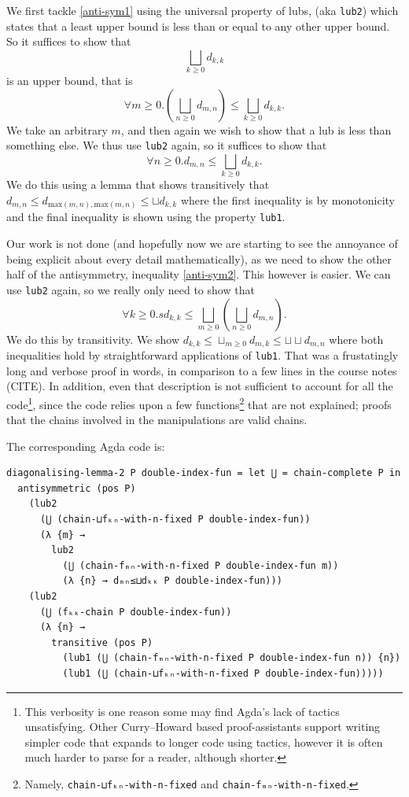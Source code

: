 \documentclass[12pt,a4paper,twoside,openright]{report}
\begin{document}
We first tackle \ref{anti-sym1} using the universal property of lubs, (aka \texttt{lub2}) which states that a least upper bound is less than or equal to any other upper bound. So it suffices to show that 
\[
\bigsqcup_{k \geq 0} d_{k, k} 
\]
is an upper bound, that is
\[
\forall m \geq 0. \left( \bigsqcup_{n\geq 0} d_{m,n} \right) \leq \bigsqcup_{k \geq 0} d_{k, k}.
\]
We take an arbitrary $m$, and then again we wish to show that a lub is less than something else. We thus use \texttt{lub2} again, so it suffices to show that
\[
\forall n \geq 0. d_{m, n} \leq \bigsqcup_{k \geq 0} d_{k , k}.
\]
We do this using a lemma that shows transitively that $d_{m,n} \leq d_{\text{max}(m,n), \text{max}(m,n)} \leq \sqcup d_{k,k}$ where the first inequality is by monotonicity and the final inequality is shown using the property \texttt{lub1}. 

Our work is not done (and hopefully now we are starting to see the annoyance of being explicit about every detail mathematically), as we need to show the other half of the antisymmetry, inequality \ref{anti-sym2}. This however is easier. We can use \texttt{lub2} again, so we really only need to show that
\[
\forall k \geq 0.s d_{k,k} \leq \bigsqcup_{m \geq 0} \left( \bigsqcup_{n\geq 0} d_{m,n} \right).
\]
We do this by transitivity. We show $d_{k,k} \leq \sqcup_{m \geq 0} d_{m,k} \leq \sqcup \sqcup d_{m,n}$ where both inequalities hold by straightforward applications of \texttt{lub1}. That was a frustatingly long and verbose proof in words, in comparison to a few lines in the course notes (CITE). In addition, even that description is not sufficient to account for all the code\footnote{This verbosity is one reason some may find Agda's lack of tactics unsatisfying. Other Curry--Howard based proof-assistants support writing simpler code that expands to longer code using tactics, however it is often much harder to parse for a reader, although shorter.}, since the code relies upon a few functions\footnote{Namely, \texttt{chain-⊔fₖₙ-with-n-fixed} and \texttt{chain-fₘₙ-with-n-fixed}.} that are not explained; proofs that the chains involved in the manipulations are valid chains. 

The corresponding Agda code is:
\begin{verbatim}
diagonalising-lemma-2 P double-index-fun = let ⋃ = chain-complete P in
  antisymmetric (pos P)
    (lub2
      (⋃ (chain-⊔fₖₙ-with-n-fixed P double-index-fun))
      (λ {m} →
        lub2
          (⋃ (chain-fₘₙ-with-n-fixed P double-index-fun m))
          (λ {n} → dₘₙ≤⊔dₖₖ P double-index-fun)))
    (lub2
      (⋃ (fₖₖ-chain P double-index-fun))
      (λ {n} →
        transitive (pos P)
          (lub1 (⋃ (chain-fₘₙ-with-n-fixed P double-index-fun n)) {n})
          (lub1 (⋃ (chain-⊔fₖₙ-with-n-fixed P double-index-fun)))))
\end{verbatim}
\end{document}
